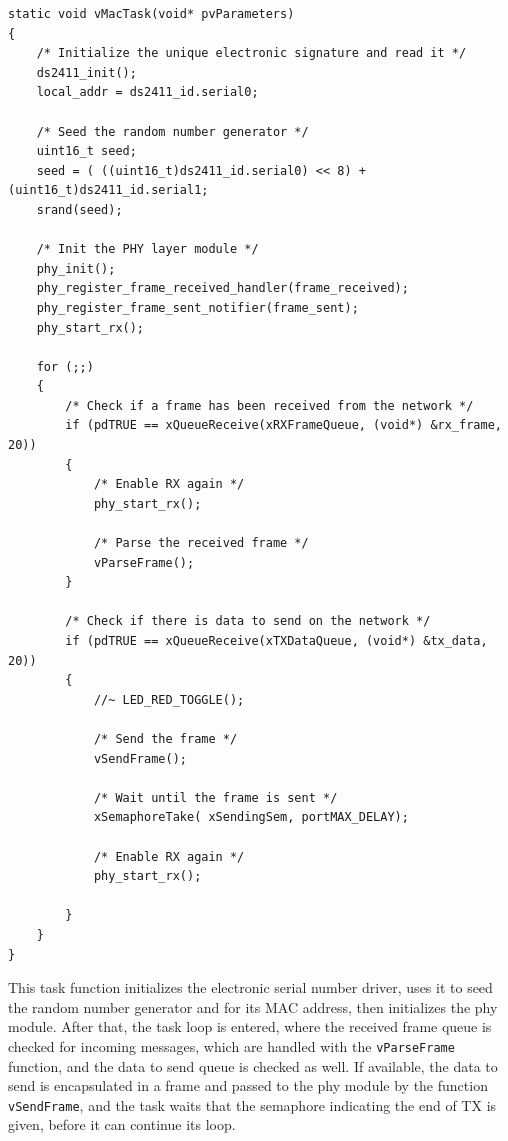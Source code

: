 \documentclass[11pt]{report}
\begin{document}
\begin{verbatim}
static void vMacTask(void* pvParameters)
{
    /* Initialize the unique electronic signature and read it */
    ds2411_init();
    local_addr = ds2411_id.serial0;

    /* Seed the random number generator */
    uint16_t seed;
    seed = ( ((uint16_t)ds2411_id.serial0) << 8) + (uint16_t)ds2411_id.serial1;
    srand(seed);

    /* Init the PHY layer module */
    phy_init();
    phy_register_frame_received_handler(frame_received);
    phy_register_frame_sent_notifier(frame_sent);
    phy_start_rx();

    for (;;)
    {
        /* Check if a frame has been received from the network */
        if (pdTRUE == xQueueReceive(xRXFrameQueue, (void*) &rx_frame, 20))
        {
            /* Enable RX again */
            phy_start_rx();

            /* Parse the received frame */
            vParseFrame();
        }

        /* Check if there is data to send on the network */
        if (pdTRUE == xQueueReceive(xTXDataQueue, (void*) &tx_data, 20))
        {
            //~ LED_RED_TOGGLE();

            /* Send the frame */
            vSendFrame();

            /* Wait until the frame is sent */
            xSemaphoreTake( xSendingSem, portMAX_DELAY);

            /* Enable RX again */
            phy_start_rx();

        }
    }
}
\end{verbatim}
This task function initializes the electronic serial number driver, uses it to seed the random number generator and for its MAC address, then initializes the phy module.
After that, the task loop is entered, where the received frame queue is checked for incoming messages, which are handled with the \verb$vParseFrame$ function, and the data to send queue is checked as well. If available, the data to send is encapsulated in a frame and passed to the phy module by the function \verb$vSendFrame$, and the task waits that the semaphore indicating the end of TX is given, before it can continue its loop.
\end{document}
